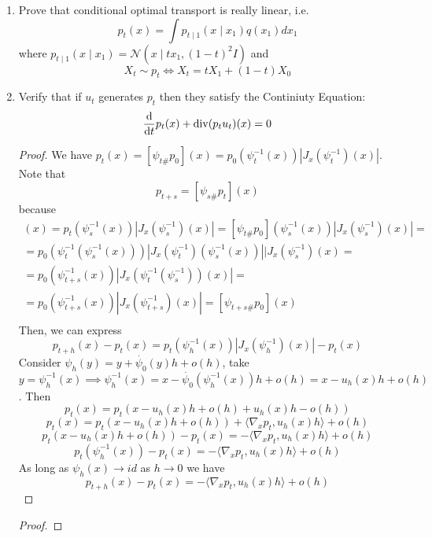 \begin{enumerate}
    \item Prove that conditional optimal transport is really linear, i.e.
    \[
    p_t(x) = \int p_{t \mid 1}(x \mid x_1) q(x_1) dx_1
    \]
    where $p_{t \mid 1}(x \mid x_1) = \mathcal{N}(x \mid t x_1, (1-t)^2 I)$ and 
    \[
    X_t \sim p_t \iff X_t = t X_1 + (1 - t)X_0
    \]
    \item Verify that if $u_t$ generates $p_t$ then they satisfy the Continiuty Equation:
    \[
    \derivative{t} p_t(x) + \Div(p_t u_t) (x) = 0
    \]
    \begin{proof}
        We have $p_t(x) = [\psi_{t\#}p_0](x) = p_0(\psi_{t}^{-1}(x))|J_x(\psi_{t}^{-1})(x)|$. Note that
        \[
        p_{t + s} = [\psi_{s\#}p_t](x)
        \]
        because
        \begin{multline*}
        [\psi_{s\#}p_t](x) = p_t (\psi_s^{-1} (x)) |J_x (\psi_s^{-1}) (x)| = [\psi_{t\#}p_0] (\psi_s^{-1}(x)) |J_x(\psi_s^{-1})(x)| = \\
        = p_0(\psi_{t}^{-1} (\psi_s^{-1} (x))) |J_x(\psi_{t}^{-1})(\psi_s^{-1}(x))| |J_x (\psi_s^{-1}) (x) = \\
        = p_0(\psi_{t+s}^{-1} (x)) |J_x(\psi_{t}^{-1}(\psi_s^{-1}))(x)| = \\
        = p_0(\psi_{t+s}^{-1} (x)) |J_x(\psi_{t+s}^{-1})(x)| = [\psi_{t+s\#}p_0](x)\\
        \end{multline*}
        Then, we can express
        \[
        p_{t+h}(x) - p_t(x) = p_t(\psi_{h}^{-1}(x))|J_x(\psi_{h}^{-1})(x)| - p_t(x)
        \]
        Consider $\psi_{h}(y) = y + \dot{\psi_{0}}(y) h + o(h)$, take $y = \psi_h^{-1}(x) \implies \psi_h^{-1}(x) = x - \dot{\psi_{0}}(\psi_h^{-1}(x)) h + o(h) = x - u_h(x) h + o(h)$. Then 
        \[
        p_t(x) = p_t(x - u_h(x)h + o(h) + u_h(x) h - o(h)) 
        \]
        \[
        p_t(x) = p_t(x - u_h(x)h + o(h)) + \langle \nabla_x p_t, u_h(x) h \rangle + o(h) 
        \]
        \[
        p_t(x - u_h(x)h + o(h)) - p_t(x) = - \langle \nabla_x p_t, u_h(x) h \rangle + o(h) 
        \]
        \[
        p_t(\psi_h^{-1}(x)) - p_t(x) = - \langle \nabla_x p_t, u_h(x) h \rangle + o(h) 
        \]
        As long as $\psi_h(x) \to id$ as $h \to 0$ we have 
        \[
        p_{t+h}(x) - p_t(x) = -\langle \nabla_x p_t, u_h(x) h \rangle + o(h) 
        \]
        
        
    \end{proof}


    \begin{proof}


\end{proof}
\end{enumerate}
